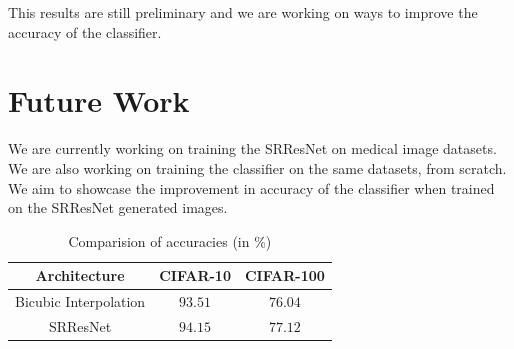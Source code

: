 \documentclass[10pt,twocolumn,letterpaper]{article}
\begin{document}
This results are still preliminary and we are working on ways to improve the accuracy of the classifier.

\section{Future Work}
We are currently working on training the SRResNet on medical image datasets. We are also working on training the classifier on the same datasets, from scratch. We aim to showcase the improvement in accuracy of the classifier when trained on the SRResNet generated images. 

\begin{table} 
    \begin{center}
    \begin{tabular}{|| c | c | c ||}
        \hline
        Architecture & CIFAR-10 & CIFAR-100 \\
        \hline\hline
        Bicubic Interpolation & $93.51$  & $76.04$ \\
        \hline
        SRResNet &  $\mathbf{94.15} $ & $\mathbf{77.12}$ \\
        \hline
    \end{tabular}
    
    \caption{Comparision of accuracies (in \%) }
    \label{tab:my_label}
    \end{center}
\end{table}

{\small


}
\end{document}
